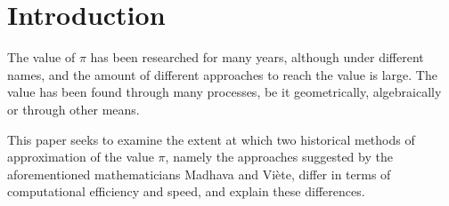 \section{Introduction}


The value of $\pi$ has been researched for many years, although under different names,
and the amount of different approaches to reach the value is large. The value has been 
found through many processes, be it geometrically, algebraically 
or through other means. 

This paper seeks to examine the extent at which two historical methods of
approximation of the value $\pi$, namely the approaches suggested by the aforementioned 
mathematicians Madhava and Viète, differ in terms of computational efficiency and 
speed, and explain these differences. 

